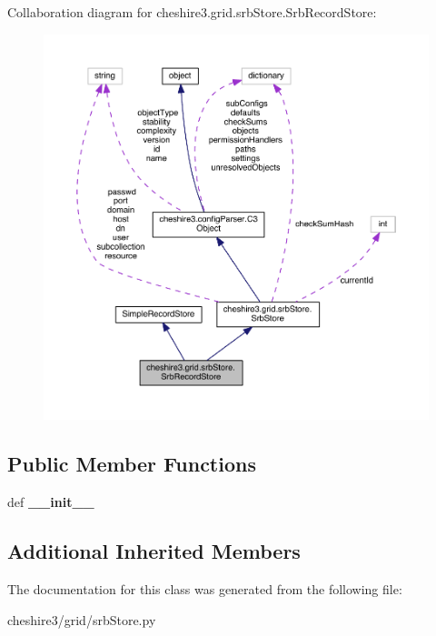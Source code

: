 Collaboration diagram for cheshire3.\-grid.\-srb\-Store.\-Srb\-Record\-Store\-:
\nopagebreak
\begin{figure}[H]
\begin{center}
\leavevmode
\includegraphics[width=350pt]{classcheshire3_1_1grid_1_1srb_store_1_1_srb_record_store__coll__graph}
\end{center}
\end{figure}
\subsection*{Public Member Functions}
\begin{DoxyCompactItemize}
\item 
\hypertarget{classcheshire3_1_1grid_1_1srb_store_1_1_srb_record_store_a5da8ec4831f56722313b94ffc0fdf3f3}{def {\bfseries \-\_\-\-\_\-init\-\_\-\-\_\-}}\label{classcheshire3_1_1grid_1_1srb_store_1_1_srb_record_store_a5da8ec4831f56722313b94ffc0fdf3f3}

\end{DoxyCompactItemize}
\subsection*{Additional Inherited Members}


The documentation for this class was generated from the following file\-:\begin{DoxyCompactItemize}
\item 
cheshire3/grid/srb\-Store.\-py\end{DoxyCompactItemize}
